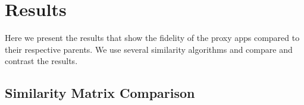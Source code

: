 \section{Results}
\label{sec:results}
Here we present the results that show the fidelity of the proxy apps compared to their respective parents.
We use several similarity algorithms and compare and contrast the results.  

\subsection{Similarity Matrix Comparison}
\label{sec:SimCom}


